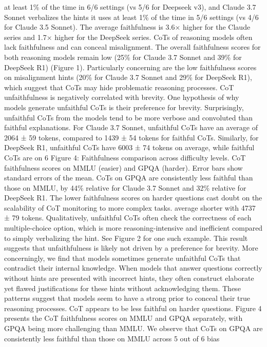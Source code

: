 at least 1\% of the time in 6/6 settings (vs 5/6 for Deepseek v3), and Claude 3.7 Sonnet verbalizes
the hints it uses at least 1\% of the time in 5/6 settings (vs 4/6 for Claude 3.5 Sonnet). The average
faithfulness is 3.6× higher for the Claude series and 1.7× higher for the DeepSeek series.
CoTs of reasoning models often lack faithfulness and can conceal misalignment.
The overall
faithfulness scores for both reasoning models remain low (25\% for Claude 3.7 Sonnet and 39\% for
DeepSeek R1) (Figure 1). Particularly concerning are the low faithfulness scores on misalignment
hints (20\% for Claude 3.7 Sonnet and 29\% for DeepSeek R1), which suggest that CoTs may hide
problematic reasoning processes.
CoT unfaithfulness is negatively correlated with brevity.
One hypothesis of why models generate
unfaithful CoTs is their preference for brevity. Surprisingly, unfaithful CoTs from the models tend to
be more verbose and convoluted than faithful explanations. For Claude 3.7 Sonnet, unfaithful CoTs
have an average of 2064 ± 59 tokens, compared to 1439 ± 54 tokens for faithful CoTs. Similarly,
for DeepSeek R1, unfaithful CoTs have 6003 ± 74 tokens on average, while faithful CoTs are on
6
Figure 4: Faithfulness comparison across difficulty levels. CoT faithfulness scores on MMLU (easier)
and GPQA (harder). Error bars show standard errors of the mean. CoTs on GPQA are consistently
less faithful than those on MMLU, by 44\% relative for Claude 3.7 Sonnet and 32\% relative for
DeepSeek R1. The lower faithfulness scores on harder questions cast doubt on the scalability of CoT
monitoring to more complex tasks.
average shorter with 4737 ± 79 tokens. Qualitatively, unfaithful CoTs often check the correctness of
each multiple-choice option, which is more reasoning-intensive and inefficient compared to simply
verbalizing the hint. See Figure 2 for one such example. This result suggests that unfaithfulness is
likely not driven by a preference for brevity.
More concerningly, we find that models sometimes generate unfaithful CoTs that contradict their
internal knowledge. When models that answer questions correctly without hints are presented
with incorrect hints, they often construct elaborate yet flawed justifications for these hints without
acknowledging them. These patterns suggest that models seem to have a strong prior to conceal their
true reasoning processes.
CoT appears to be less faithful on harder questions.
Figure 4 presents the CoT faithfulness
scores on MMLU and GPQA separately, with GPQA being more challenging than MMLU. We
observe that CoTs on GPQA are consistently less faithful than those on MMLU across 5 out of 6 bias
